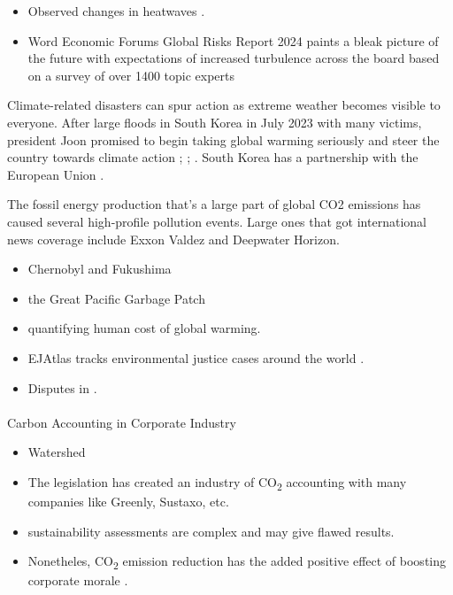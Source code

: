 \documentclass[
  letterpaper,
  DIV=11,
  numbers=noendperiod]{scrartcl}
\makeatletter
\let\oldparagraph\paragraph
\renewcommand{\paragraph}{
    \@ifstar
      \xxxParagraphStar
      \xxxParagraphNoStar
  }
\newcommand{\xxxParagraphStar}[1]{\oldparagraph*{#1}\mbox{}}
\newcommand{\xxxParagraphNoStar}[1]{\oldparagraph{#1}\mbox{}}
\providecommand{\tightlist}{%
  \setlength{\itemsep}{0pt}\setlength{\parskip}{0pt}}\usepackage{longtable,booktabs,array}
\makeatother
\begin{document}
\begin{itemize}
\tightlist
\item
  Observed changes in heatwaves
  \citep{perkins-kirkpatrickExtremeHeatClimate2023}.
\item
  Word Economic Forums Global Risks Report 2024 paints a bleak picture
  of the future with expectations of increased turbulence across the
  board based on a survey of over 1400 topic experts
  \citet{worldeconomicforumGlobalRisksReport}
\end{itemize}

Climate-related disasters can spur action as extreme weather becomes
visible to everyone. After large floods in South Korea in July 2023 with
many victims, president Joon promised to begin taking global warming
seriously and steer the country towards climate action
\citet{webSouthKoreaPresident2023}; \citet{afpKoreaPresidentVows2023};
\citet{aljazeeraDeathTollKorea2023}. South Korea has a partnership with
the European Union \citet{europeancommissionEURepublicKorea2023}.

The fossil energy production that's a large part of global CO2 emissions
has caused several high-profile pollution events. Large ones that got
international news coverage include Exxon Valdez and Deepwater Horizon.

\begin{itemize}
\tightlist
\item
  Chernobyl and Fukushima
\item
  the Great Pacific Garbage Patch
\item
  \citet{lentonQuantifyingHumanCost2023} quantifying human cost of
  global warming.
\item
  EJAtlas tracks environmental justice cases around the world \citep[see
  coverage by][ and \citet{martinez-alierReplyOrihuelaExtractivism2022}
  as well as
  \citet{scheidelEnvironmentalConflictsDefenders2020}]{martinez-alierMappingEcologicalDistribution2021}.
\item
  Disputes in \citet{eerolaCorporateConductCommodity2022}.
\end{itemize}

\paragraph{Carbon Accounting in Corporate
Industry}\label{carbon-accounting-in-corporate-industry}

\begin{itemize}
\item
  Watershed
\item
  The legislation has created an industry of CO\textsubscript{2}
  accounting with many companies like Greenly, Sustaxo, etc.
\item
  \citet{quatriniChallengesOpportunitiesScale2021} sustainability
  assessments are complex and may give flawed results.
\item
  Nonetheles, CO\textsubscript{2} emission reduction has the added
  positive effect of boosting corporate morale
  \citep{caoImpactLoweringCarbon2023}.
\end{itemize}
\end{document}
